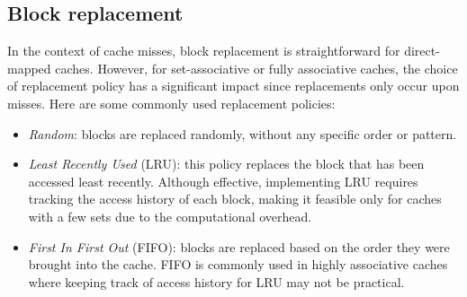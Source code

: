\subsection{Block replacement}
In the context of cache misses, block replacement is straightforward for direct-mapped caches. 
However, for set-associative or fully associative caches, the choice of replacement policy has a significant impact since replacements only occur upon misses. 
Here are some commonly used replacement policies:
\begin{itemize}
    \item \textit{Random}: blocks are replaced randomly, without any specific order or pattern.
    \item \textit{Least Recently Used} (LRU): this policy replaces the block that has been accessed least recently. 
        Although effective, implementing LRU requires tracking the access history of each block, making it feasible only for caches with a few sets due to the computational overhead.
    \item \textit{First In First Out} (FIFO): blocks are replaced based on the order they were brought into the cache. 
        FIFO is commonly used in highly associative caches where keeping track of access history for LRU may not be practical.
\end{itemize}

